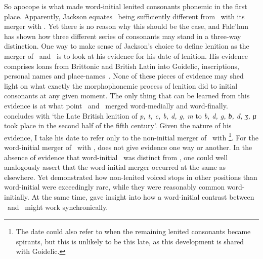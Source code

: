So apocope is what made word-initial lenited consonants phonemic in the first place. Apparently, Jackson equates  \lT\ being sufficiently different from \xT\ with its merger with \xD. Yet there is no reason why this should be the case, and Falc'hun has shown how three different series of consonants may stand in a three-way distinction. One way to make sense of Jackson's choice to define lenition as the merger of \lT\ and \xD\  is to look at his evidence for his date of lenition. His evidence comprises loans from Brittonic and British Latin into Goidelic, inscriptions, personal names and place-names~\autocite[§§~133–134]{jackson_language_1953}. None of these pieces of evidence may shed light on what exactly the morphophonemic process of lenition did to initial consonants at any given moment. The only thing that can be learned from this evidence is at what point \lT\ and \xD\ merged word-medially and word-finally. \Textcite[§~142]{jackson_language_1953} concludes with `the Late British lenition of \textit{p, t, c, b, d, g, m} to \textit{b, d, g, ƀ, đ, ʒ, μ} took place in the second half of the fifth century'. Given the nature of his evidence, I take his date to refer only to the non-initial merger of \lT\ with \xD\footnote{The date could also refer to when the remaining lenited consonants became spirants, but this is unlikely to be this late, as this development is shared with Goidelic.}. For the word-initial merger of \lT\ with \xD, \textcite{jackson_language_1953} does not give evidence one way or another. In the absence of evidence that word-initial \lT\ was distinct from \xD, one could well analogously assert that the word-initial merger occurred at the same as elsewhere. Yet \textcite{martinet_celtic_1952} demonstrated how non-lenited voiced stops in other positions than word-initial were exceedingly rare, while they were reasonably common word-initially. At the same time, \textcite{falchun_systeme_1951} gave insight into how a word-initial contrast between \xD\ and \lT\ might work synchronically. 


